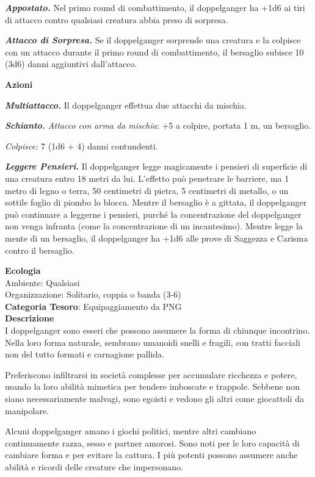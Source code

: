 \begin{multicols}{2}
{\emph{\textbf{Appostato.}} Nel primo round di combattimento, il doppelganger ha +1d6 ai tiri di attacco contro qualsiasi creatura abbia preso di sorpresa.

\emph{\textbf{Attacco di Sorpresa.}} Se il doppelganger sorprende una creatura e la colpisce con un attacco durante il primo round di combattimento, il bersaglio subisce 10 (3d6) danni aggiuntivi dall'attacco.

\textbf{Azioni}

\emph{\textbf{Multiattacco.}} Il doppelganger effettua due attacchi da mischia.

\emph{\textbf{Schianto.} Attacco con arma da mischia}: +5 a colpire, portata 1 m, un bersaglio.

\emph{Colpisce:} 7 (1d6 + 4) danni contundenti.

\emph{\textbf{Leggere Pensieri.}} Il doppelganger legge magicamente i pensieri di superficie di una creatura entro 18 metri da lui. L'effetto può penetrare le barriere, ma 1 metro di legno o terra, 50 centimetri di pietra, 5 centimetri di metallo, o un sottile foglio di piombo lo blocca. Mentre il bersaglio è a gittata, il doppelganger può continuare a leggerne i pensieri, purché la concentrazione del doppelganger non venga infranta (come la concentrazione di un incantesimo). Mentre legge la mente di un bersaglio, il doppelganger ha +1d6 alle prove di Saggezza e Carisma contro il bersaglio.

\textbf{Ecologia}\\
Ambiente: Qualsiasi\\
Organizzazione: Solitario, coppia o banda (3-6)\\
\textbf{Categoria Tesoro}: Equipaggiamento da PNG\\
\textbf{Descrizione}\\
I doppelganger sono esseri che possono assumere la forma di chiunque incontrino. Nella loro forma naturale, sembrano umanoidi snelli e fragili, con tratti facciali non del tutto formati e carnagione pallida.

Preferiscono infiltrarsi in società complesse per accumulare ricchezza e potere, usando la loro abilità mimetica per tendere imboscate e trappole. Sebbene non siano necessariamente malvagi, sono egoisti e vedono gli altri come giocattoli da manipolare.

Alcuni doppelganger amano i giochi politici, mentre altri cambiano continuamente razza, sesso e partner amorosi. Sono noti per le loro capacità di cambiare forma e per evitare la cattura. I più potenti possono assumere anche abilità e ricordi delle creature che impersonano.

}
\end{multicols}
